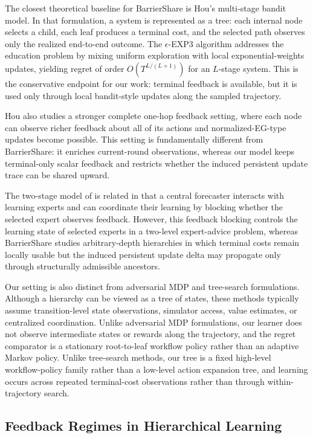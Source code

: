The closest theoretical baseline for BarrierShare is Hou's multi-stage bandit model.
In that formulation, a system is represented as a tree: each internal node selects a child, each leaf produces a terminal cost, and the selected path observes only the realized end-to-end outcome.
The $\epsilon$-EXP3 algorithm addresses the education problem by mixing uniform exploration with local exponential-weights updates, yielding regret of order \(O(T^{L/(L+1)})\) for an \(L\)-stage system.
This is the conservative endpoint for our work: terminal feedback is available, but it is used only through local bandit-style updates along the sampled trajectory.

Hou also studies a stronger complete one-hop feedback setting, where each node can observe richer feedback about all of its actions and normalized-EG-type updates become possible.
This setting is fundamentally different from BarrierShare: it enriches current-round observations, whereas our model keeps terminal-only scalar feedback and restricts whether the induced persistent update trace can be shared upward.

The two-stage model of \citet{singla2018learning} is related in that a central forecaster interacts with learning experts and can coordinate their learning by blocking whether the selected expert observes feedback.
However, this feedback blocking controls the learning state of selected experts in a two-level expert-advice problem, whereas BarrierShare studies arbitrary-depth hierarchies in which terminal costs remain locally usable but the induced persistent update delta may propagate only through structurally admissible ancestors.

Our setting is also distinct from adversarial MDP and tree-search formulations.
Although a hierarchy can be viewed as a tree of states, these methods typically assume transition-level state observations, simulator access, value estimates, or centralized coordination.
Unlike adversarial MDP formulations, our learner does not observe intermediate states or rewards along the trajectory, and the regret comparator is a stationary root-to-leaf workflow policy rather than an adaptive Markov policy.
Unlike tree-search methods, our tree is a fixed high-level workflow-policy family rather than a low-level action expansion tree, and learning occurs across repeated terminal-cost observations rather than through within-trajectory search.

\subsection{Feedback Regimes in Hierarchical Learning}

